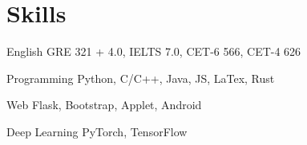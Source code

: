 \documentclass[12pt,letterpaper]{report}
\begin{document}

    \section*{Skills}
    \begin{tablist}
        \item[English] \tab{}GRE 321 + 4.0, IELTS 7.0, CET-6 566, CET-4 626
        \item[Programming] \tab{}Python, C/C++, Java, JS, LaTex, Rust
        \item[Web] \tab{}\tab{}Flask, Bootstrap, Applet, Android
        \item[Deep Learning] \tab{}PyTorch, TensorFlow
    \end{tablist}
\end{document}
